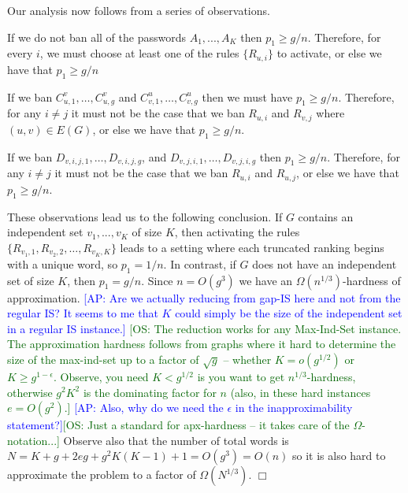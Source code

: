\documentclass[prodmode,acmec]{ec-acmsmall}
\newcommand{\kibitz}[2]{\ifnum\Comments=1\textcolor{#1}{#2}\fi}
\newcommand{\ap}[1]{\kibitz{blue} {[AP: #1]}}
\newcommand{\os}[1]{\kibitz{darkgreen} {[OS: #1]}}
\def \QED {\hfill{$\Box$}}
\newenvironment{proofof}[1]{\noindent {\em Proof of #1.  }}{\QED}
\begin{document}
\begin{proofof}{Theorem~\ref{thm:HardnessOfApproximationOptimalCombinationOfSubsets}}
Our analysis now follows from a series of observations.

\medskip

 If we do not ban all of the passwords $A_1,..., A_K$ then $p_1 \geq g/n$.  Therefore, for every $i$, we must choose at least one of the rules $\{R_{u,i} \}$ to activate, or else we have that $p_1 \geq g/n$

\medskip

 If we ban $C_{u,1}^v, \ldots, C_{u,g}^v$ and $C_{v,1}^u, \ldots, C_{v,g}^u$ then we must have $p_1 \geq g/n$. Therefore, for any $i\neq j$ it must not be the case that we ban $R_{u,i}$ and $R_{v,j}$ where $(u,v)\in E(G)$, or else we have that $p_1 \geq g/n$.

\medskip

 If we ban $D_{v,i,j,1}, \ldots, D_{v,i,j,g}$, and $D_{v,j,i,1} , \ldots, D_{v,j,i,g}$ then $p_1\geq g/n$. Therefore, for any $i\neq j$ it must not be the case that we ban $R_{u,i}$ and $R_{u,j}$, or else we have that $p_1 \geq g/n$.

\medskip 

These observations lead us to the following conclusion. If $G$ contains an independent set $v_1,...,v_K$ of size $K$, then activating the rules $\{R_{v_1,1}, R_{v_2,2}, \ldots, R_{v_K,K}\}$ leads to a setting where each truncated ranking begins with a unique word, so $p_1 = 1/n$. In contrast, if $G$ does not have an independent set of size $K$, then $p_1 = g/n$. 
Since $n = O(g^3)$ we have an $\Omega(n^{1/3})$-hardness of approximation. \ap{Are we actually reducing from gap-IS here and not from the regular IS? It seems to me that $K$ could simply be the size of the independent set in a regular IS instance.} \os{The reduction works for any Max-Ind-Set instance. The approximation hardness follows from graphs where it hard to determine the size of the max-ind-set up to a factor of $\sqrt g$ -- whether $K = o(g^{1/2})$ or $K\geq g^{1-\epsilon}$. Observe, you need $K < g^{1/2}$ is you want to get $n^{1/3}$-hardness, otherwise $g^2K^2$ is the dominating factor for $n$ (also, in these hard instances $e = O(g^2)$.} \ap{Also, why do we need the $\epsilon$ in the inapproximability statement?}\os{Just a standard for apx-hardness -- it takes care of the $\Omega$-notation...} Observe also that the number of total words is $N = K+g+2eg + g^2K(K-1) +1= O(g^3) = O(n)$ so it is also hard to approximate the problem to a factor of $\Omega(N^{1/3})$.
\end{proofof}
\end{document}
